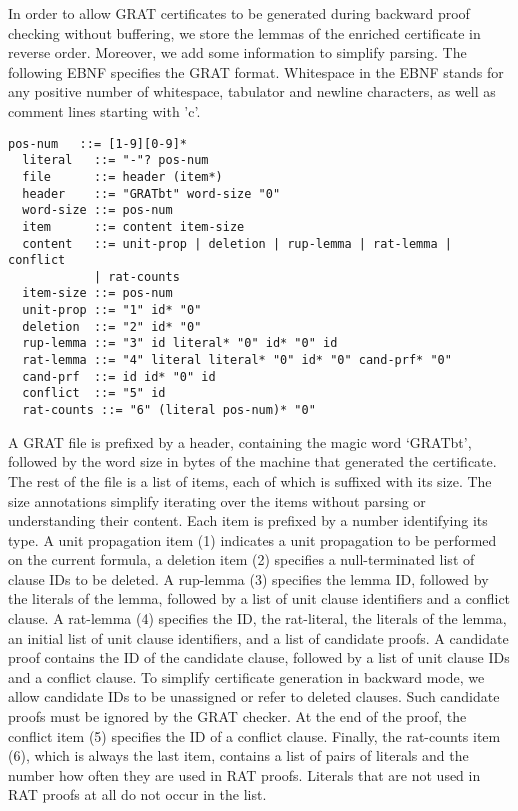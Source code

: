 \documentclass{llncs}
\begin{document}
In order to allow GRAT certificates to be generated during backward proof checking without buffering, we store the lemmas of the enriched certificate in reverse order.
Moreover, we add some information to simplify parsing. The following EBNF specifies the GRAT format. Whitespace in the EBNF stands for any positive number of 
whitespace, tabulator and newline characters, as well as comment lines starting with 'c'.
\begin{lstlisting}[language={},columns={[c]fullflexible},literate={}]
  pos-num   ::= [1-9][0-9]*
  literal   ::= "-"? pos-num
  file      ::= header (item*)
  header    ::= "GRATbt" word-size "0"
  word-size ::= pos-num
  item      ::= content item-size
  content   ::= unit-prop | deletion | rup-lemma | rat-lemma | conflict 
            | rat-counts
  item-size ::= pos-num
  unit-prop ::= "1" id* "0"
  deletion  ::= "2" id* "0"
  rup-lemma ::= "3" id literal* "0" id* "0" id
  rat-lemma ::= "4" literal literal* "0" id* "0" cand-prf* "0"
  cand-prf  ::= id id* "0" id
  conflict  ::= "5" id
  rat-counts ::= "6" (literal pos-num)* "0"
\end{lstlisting}
A GRAT file is prefixed by a header, containing the magic word `GRATbt', followed by the word size in bytes of the machine that generated the certificate. 
The rest of the file is a list of items, each of which is suffixed with its size.
The size annotations simplify iterating over the items without parsing or understanding their content.
Each item is prefixed by a number identifying its type. A unit propagation item (1) indicates a unit propagation to be performed on the current formula,
a deletion item (2) specifies a null-terminated list of clause IDs to be deleted. 
A rup-lemma (3) specifies the lemma ID, followed by the literals of the lemma, followed by a list of unit clause identifiers and a conflict clause.
A rat-lemma (4) specifies the ID, the rat-literal, the literals of the lemma, an initial list of unit clause identifiers, and a list of candidate proofs.
A candidate proof contains the ID of the candidate clause, followed by a list of unit clause IDs and a conflict clause. To simplify certificate generation in backward mode, we allow candidate IDs to be unassigned or refer to deleted clauses. Such candidate proofs must be ignored by the GRAT checker.
At the end of the proof, the conflict item (5) specifies the ID of a conflict clause.
Finally, the rat-counts item (6), which is always the last item, contains a list of pairs of literals and the number how often they are used in RAT proofs. 
Literals that are not used in RAT proofs at all do not occur in the list.
\end{document}
